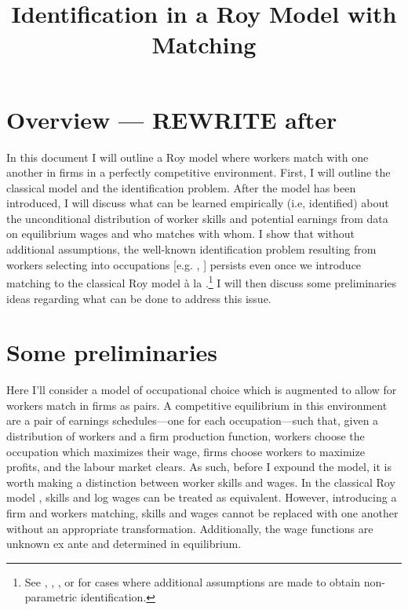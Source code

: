 \documentclass[12 pt]{article}
\title{Identification in a Roy Model with Matching}
\author{}
\date{}
\begin{document}
\maketitle
\vspace*{-2cm}
\onehalfspacing

\section{Overview --- REWRITE after}

In this document I will outline a Roy model where workers match with one another in firms in a perfectly competitive environment. First, I will outline the classical \citet{roy1951some} model and the identification problem. After the model has been introduced, I will discuss what can be learned empirically (i.e, identified) about the unconditional distribution of worker skills and potential earnings from data on equilibrium wages and who matches with whom. I show that without additional assumptions, the well-known identification problem resulting from workers selecting into occupations [e.g. \citet{heckman1990empirical}, \citet{french2011identification}] persists even once we introduce matching to the classical Roy model \`{a} la \citet{mak2025occupational}.\footnote{See \citet{heckman1990empirical}, \citet{bayer2011nonparametric}, \citet{buera2006non}, or \citet{mourifie2020sharp} for cases where additional assumptions are made to obtain non-parametric identification.} I will then discuss some preliminaries ideas regarding what can be done to address this issue.  

\section{Some preliminaries}

Here I'll consider a model of occupational choice which is augmented to allow for workers match in firms as pairs. A competitive equilibrium in this environment are a pair of earnings schedules---one for each occupation---such that, given a distribution of workers and a firm production function, workers choose the occupation which maximizes their wage, firms choose workers to maximize profits, and the labour market clears. As such, before I expound the model, it is worth making a distinction between worker skills and wages. In the classical Roy model \citep{heckman1990empirical}, skills and log wages can be treated as equivalent. However, introducing a firm and workers matching, skills and wages cannot be replaced with one another without an appropriate transformation. Additionally, the wage functions are unknown ex ante and determined in equilibrium.
\end{document}

